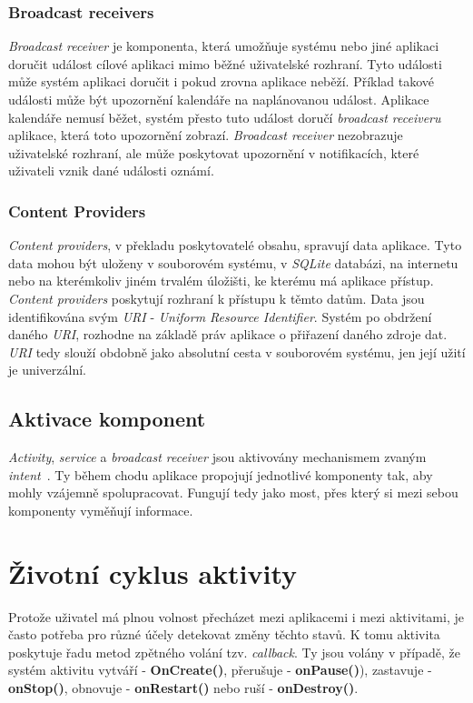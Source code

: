         \subsubsection{Broadcast receivers}
        \emph{Broadcast receiver} je komponenta, která umožňuje systému nebo jiné aplikaci doručit událost cílové aplikaci mimo běžné uživatelské rozhraní. Tyto události může systém aplikaci doručit i pokud zrovna aplikace neběží. Příklad takové události může být upozornění kalendáře na naplánovanou událost. Aplikace kalendáře nemusí běžet, systém přesto tuto událost doručí \emph{broadcast receiveru} aplikace, která toto upozornění zobrazí. \emph{Broadcast receiver} nezobrazuje uživatelské rozhraní, ale může poskytovat upozornění v notifikacích, které uživateli vznik dané události oznámí.

        \subsubsection{Content Providers}
        \emph{Content providers}, v překladu poskytovatelé obsahu, spravují data aplikace. Tyto data mohou být uloženy v souborovém systému, v \emph{SQLite} databázi, na internetu nebo na kterémkoliv jiném trvalém úložišti, ke kterému má aplikace přístup. \emph{Content providers} poskytují rozhraní k přístupu k těmto datům. Data jsou identifikována svým \emph{URI} - \emph{Uniform Resource Identifier}. Systém po obdržení daného \emph{URI}, rozhodne na základě práv aplikace o přiřazení daného zdroje dat. \emph{URI} tedy slouží obdobně jako absolutní cesta v souborovém systému, jen její užití je univerzální.

    \subsection{Aktivace komponent}
    \emph{Activity}, \emph{service} a \emph{broadcast receiver} jsou aktivovány mechanismem zvaným \emph{intent}~. Ty během chodu aplikace propojují jednotlivé komponenty tak, aby mohly vzájemně spolupracovat. Fungují tedy jako most, přes který si mezi sebou komponenty vyměňují informace.

\newpage
\section{Životní cyklus aktivity}
Protože uživatel má plnou volnost přecházet mezi aplikacemi i mezi aktivitami, je často potřeba pro různé účely detekovat změny těchto stavů. K tomu aktivita poskytuje řadu metod zpětného volání tzv. \emph{callback}. Ty jsou volány v případě, že systém aktivitu vytváří - \textbf{OnCreate()}, přerušuje - \textbf{onPause()}), zastavuje - \textbf{onStop()}, obnovuje - \textbf{onRestart()} nebo ruší - \textbf{onDestroy()}.

